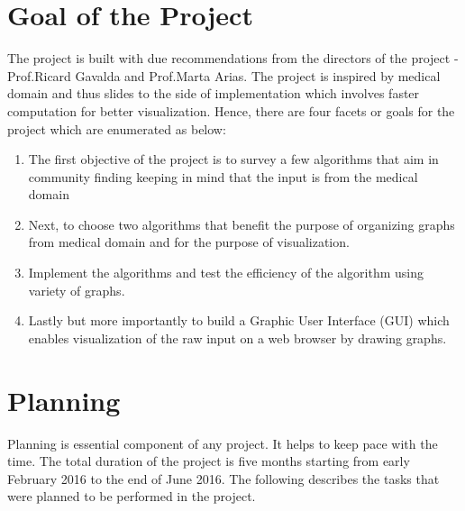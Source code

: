 \section{Goal of the Project}
The project is built with due recommendations from the directors of the project - Prof.Ricard Gavalda and Prof.Marta Arias. The project is inspired by medical domain and thus slides to the side of implementation which involves faster computation for better visualization. Hence, there are four facets or goals for the project which are enumerated as below:
\begin{enumerate}
\item The first objective of the project is to survey a few algorithms that aim in community finding keeping in mind that the input is from the medical domain 
\item Next, to choose two algorithms that benefit the purpose of organizing graphs from medical domain and for the purpose of visualization.
\item Implement the algorithms and test the efficiency of the algorithm using variety of graphs.
\item Lastly but more importantly to build a Graphic User Interface (GUI) which enables visualization of the raw input on a web browser by drawing graphs.

\end{enumerate}
\section{Planning}
Planning is essential component of any project. It helps to keep pace with the time.
The total duration of the project is five months starting from early February 2016 to the end of June 2016. The following describes the tasks that were planned to be performed in the project.
